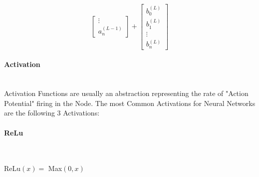 \begin{flushleft}
\begin{center}
\[\begin{bmatrix}
                        \vdots      \\
                        a^{(L-1)}_{n} 
                        \end{bmatrix}
                        +
                        \begin{bmatrix}
                        b^{(L)}_{0} \\
                        b^{(L)}_{1} \\
                        \vdots      \\
                        b^{(L)}_{n} 
                        \end{bmatrix}
                        \]
                    \end{center}
                    \vspace{0.2cm}

                \paragraph{Activation} \mbox{} \\
                    \vspace{0.2cm}
                    Activation Functions are usually an abstraction representing the rate of "Action Potential" firing in the Node.
                    The most Common Activations for Neural Networks are the following 3 Activations: \\
                \paragraph{ReLu} \mbox{} \\
                    \begin{center}
                        ReLu$(x) = $ Max$(0, x)$ \\
                        \vspace{0.2cm}
                    \end{center}


\end{flushleft}
